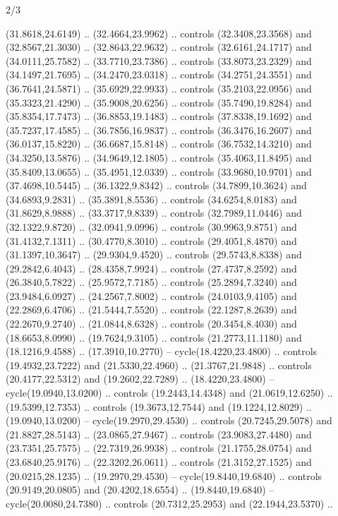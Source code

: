 \begin{flagdescription}{2/3}
\begin{scope}[yshift=\flagwidth,scale=\flagwidth/1241.93737]
\begin{scope}[y=-1mm, x=1mm,draw=gold,fill=blue,line join=miter,miter limit=4,line width=1.8\lw]
\begin{scope}[y=1mm, x=1mm, yscale=-1,shift={(573.68mm+\str,145.75)}]
\begin{scope}[scale=1.35,shift={(-9,-3)}]
\begin{scope}[scale=0.55]
\begin{scope}[scale=1.333]
    (31.8618,24.6149) .. (32.4664,23.9962) .. controls (32.3408,23.3568) and
    (32.8567,21.3030) .. (32.8643,22.9632) .. controls (32.6161,24.1717) and
    (34.0111,25.7582) .. (33.7710,23.7386) .. controls (33.8073,23.2329) and
    (34.1497,21.7695) .. (34.2470,23.0318) .. controls (34.2751,24.3551) and
    (36.7641,24.5871) .. (35.6929,22.9933) .. controls (35.2103,22.0956) and
    (35.3323,21.4290) .. (35.9008,20.6256) .. controls (35.7490,19.8284) and
    (35.8354,17.7473) .. (36.8853,19.1483) .. controls (37.8338,19.1692) and
    (35.7237,17.4585) .. (36.7856,16.9837) .. controls (36.3476,16.2607) and
    (36.0137,15.8220) .. (36.6687,15.8148) .. controls (36.7532,14.3210) and
    (34.3250,13.5876) .. (34.9649,12.1805) .. controls (35.4063,11.8495) and
    (35.8409,13.0655) .. (35.4951,12.0339) .. controls (33.9680,10.9701) and
    (37.4698,10.5445) .. (36.1322,9.8342) .. controls (34.7899,10.3624) and
    (34.6893,9.2831) .. (35.3891,8.5536) .. controls (34.6254,8.0183) and
    (31.8629,8.9888) .. (33.3717,9.8339) .. controls (32.7989,11.0446) and
    (32.1322,9.8720) .. (32.0941,9.0996) .. controls (30.9963,9.8751) and
    (31.4132,7.1311) .. (30.4770,8.3010) .. controls (29.4051,8.4870) and
    (31.1397,10.3647) .. (29.9304,9.4520) .. controls (29.5743,8.8338) and
    (29.2842,6.4043) .. (28.4358,7.9924) .. controls (27.4737,8.2592) and
    (26.3840,5.7822) .. (25.9572,7.7185) .. controls (25.2894,7.3240) and
    (23.9484,6.0927) .. (24.2567,7.8002) .. controls (24.0103,9.4105) and
    (22.2869,6.4706) .. (21.5444,7.5520) .. controls (22.1287,8.2639) and
    (22.2670,9.2740) .. (21.0844,8.6328) .. controls (20.3454,8.4030) and
    (18.6653,8.0990) .. (19.7624,9.3105) .. controls (21.2773,11.1180) and
    (18.1216,9.4588) .. (17.3910,10.2770) -- cycle(18.4220,23.4800) .. controls
    (19.4932,23.7222) and (21.5330,22.4960) .. (21.3767,21.9848) .. controls
    (20.4177,22.5312) and (19.2602,22.7289) .. (18.4220,23.4800) --
    cycle(19.0940,13.0200) .. controls (19.2443,14.4348) and (21.0619,12.6250) ..
    (19.5399,12.7353) .. controls (19.3673,12.7544) and (19.1224,12.8029) ..
    (19.0940,13.0200) -- cycle(19.2970,29.4530) .. controls (20.7245,29.5078) and
    (21.8827,28.5143) .. (23.0865,27.9467) .. controls (23.9083,27.4480) and
    (23.7351,25.7575) .. (22.7319,26.9938) .. controls (21.1755,28.0754) and
    (23.6840,25.9176) .. (22.3202,26.0611) .. controls (21.3152,27.1525) and
    (20.0215,28.1235) .. (19.2970,29.4530) -- cycle(19.8440,19.6840) .. controls
    (20.9149,20.0805) and (20.4202,18.6554) .. (19.8440,19.6840) --
    cycle(20.0080,24.7380) .. controls (20.7312,25.2953) and (22.1944,23.5370) ..

\end{scope}
\end{scope}
\end{scope}
\end{scope}
\end{scope}
\end{scope}
\end{flagdescription}

